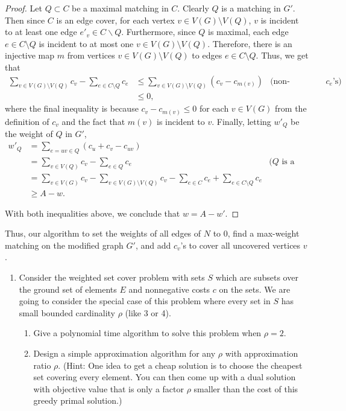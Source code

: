 \documentclass[11pt,letterpaper]{article}
\theoremstyle{definition}
\begin{document}
\begin{proof}
    Let $Q\subset C$ be a maximal matching in $C$. 
    Clearly $Q$ is a matching in $G'$.
    Then since $C$ is an edge cover, for each vertex $v\in V(G)\setminus V(Q)$, $v$ is incident to at least one edge $e'_v\in C\backslash Q$.
    Furthermore, since $Q$ is maximal, each edge $e\in C\setminus Q$ is incident to at most one $v\in V(G)\setminus V(Q)$.
    Therefore, there is an injective map $m$ from vertices $v\in V(G)\setminus V(Q)$ to edges $e\in C\setminus Q$.
    Thus, we get that
    \begin{align*}
        \sum_{v\in V(G)\setminus V(Q)}c_v - \sum_{e\in C\setminus Q}c_e & \leq \sum_{v\in V(G)\setminus V(Q)}(c_v - c_{m(v)}) &\text{(non-negativity of $c_e$'s)} \\
        &\leq 0,
    \end{align*}
    where the final inequality is because $c_v - c_{m(v)}\leq 0$ for each $v\in V(G)$ from the definition of $c_v$ and the fact that $m(v)$ is incident to $v$.
    Finally, letting $w'_Q$ be the weight of $Q$ in $G'$,
    \begin{align*}
        w'_Q &= \sum_{e=uv\in Q} (c_u+c_v-c_{uv})\\
        &=\sum_{v\in V(Q)} c_v - \sum_{e\in Q} c_e  &\text{($Q$ is a matching)} \\
        &=\sum_{v\in V(G)} c_v - \sum_{v\in V(G)\setminus V(Q)}c_v -\sum_{e\in C}c_e + \sum_{e\in C\setminus Q} c_e \\
        &\geq A - w.
    \end{align*}

    With both inequalities above, we conclude that $w = A-w'$.
\end{proof}

Thus, our algorithm to set the weights of all edges of $N$ to 0, find a max-weight matching on the modified graph $G'$, and add $c_v$'s to cover all uncovered vertices $v$.


\begin{enumerate}[resume=q]
\item Consider the weighted set cover problem with sets $S$ which are subsets over the ground set of elements $E$ and nonnegative costs $c$ on the sets. We are going to consider the special case of this problem where every set in $S$ has small bounded cardinality $\rho$ (like 3 or 4).
\begin{enumerate}
\item Give a polynomial time algorithm to solve this problem when $\rho = 2$.
\item Design a simple approximation algorithm for any $\rho$ with approximation ratio $\rho$. (Hint: One idea to get a cheap solution is to choose the cheapest set covering every element. You can then come up with a dual solution with objective value that is only a factor $\rho$ smaller than the cost of this greedy primal solution.)
\end{enumerate}
\end{enumerate}
\end{document}
